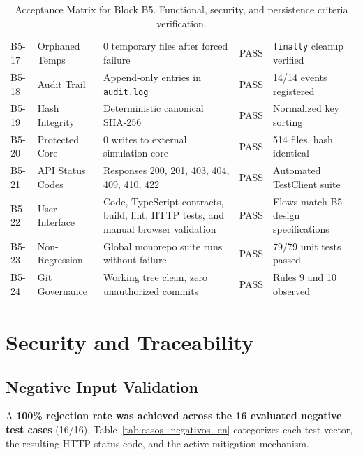 \documentclass[11pt,a4paper]{article}
\begin{document}
\begin{table}[H]
\begin{tabularx}{\textwidth}{p{1.1cm}p{3.3cm}Xp{1.5cm}p{3.2cm}}
B5-17 & Orphaned Temps & 0 temporary files after forced failure & PASS & \texttt{finally} cleanup verified \\
B5-18 & Audit Trail & Append-only entries in \texttt{audit.log} & PASS & 14/14 events registered \\
B5-19 & Hash Integrity & Deterministic canonical SHA-256 & PASS & Normalized key sorting \\
B5-20 & Protected Core & 0 writes to external simulation core & PASS & 514 files, hash identical \\
B5-21 & API Status Codes & Responses 200, 201, 403, 404, 409, 410, 422 & PASS & Automated TestClient suite \\
B5-22 & User Interface & Code, TypeScript contracts, build, lint, HTTP tests, and manual browser validation & PASS & Flows match B5 design specifications \\
B5-23 & Non-Regression & Global monorepo suite runs without failure & PASS & 79/79 unit tests passed \\
B5-24 & Git Governance & Working tree clean, zero unauthorized commits & PASS & Rules 9 and 10 observed \\
\bottomrule
\end{tabularx}
\caption{Acceptance Matrix for Block B5. Functional, security, and persistence criteria verification.}
\label{tab:matriz_b5_en}
\end{table}

\section{Security and Traceability}

\subsection{Negative Input Validation}
A \textbf{100\% rejection rate was achieved across the 16 evaluated negative test cases} (16/16). Table~\ref{tab:casos_negativos_en} categorizes each test vector, the resulting HTTP status code, and the active mitigation mechanism.
\end{document}
